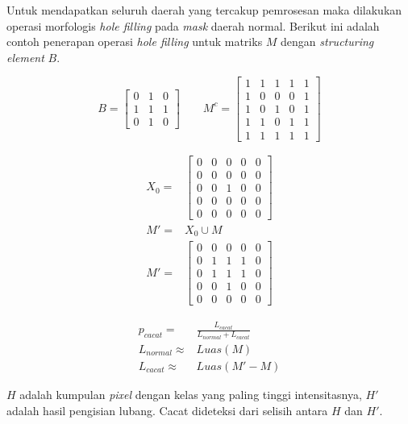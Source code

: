 \documentclass[laporan.tex]{subfiles}
\begin{document}
Untuk mendapatkan seluruh daerah yang tercakup pemrosesan maka dilakukan operasi morfologis \emph{hole filling} pada \emph{mask} daerah normal. Berikut ini adalah contoh penerapan operasi \emph{hole filling} untuk matriks $M$ dengan \emph{structuring element} $B$.

\begin{equation*}
B = \begin{bmatrix}
0 & 1 & 0 \\
1 & 1 & 1 \\
0 & 1 & 0
\end{bmatrix} \qquad
M^c = \begin{bmatrix}
1 & 1 & 1 & 1 & 1 \\
1 & 0 & 0 & 0 & 1 \\
1 & 0 & 1 & 0 & 1 \\
1 & 1 & 0 & 1 & 1 \\
1 & 1 & 1 & 1 & 1
\end{bmatrix}
\end{equation*}

\begin{align*}
X_0 = & \begin{bmatrix}
0 & 0 & 0 & 0 & 0 \\
0 & 0 & 0 & 0 & 0 \\
0 & 0 & 1 & 0 & 0 \\
0 & 0 & 0 & 0 & 0 \\
0 & 0 & 0 & 0 & 0
\end{bmatrix} \\
M' = & X_0 \cup M \\
M'  = & \begin{bmatrix}
0 & 0 & 0 & 0 & 0 \\
0 & 1 & 1 & 1 & 0 \\
0 & 1 & 1 & 1 & 0 \\
0 & 0 & 1 & 0 & 0 \\
0 & 0 & 0 & 0 & 0
\end{bmatrix}
\end{align*}

\begin{align}
	p_{cacat} = & \frac{L_{cacat}}{L_{normal} + L_{cacat}} \\
	L_{normal} \approx & Luas(M) \\
	L_{cacat} \approx & Luas(M' - M)
\end{align}

$H$ adalah kumpulan \emph{pixel} dengan kelas yang paling tinggi intensitasnya, $H'$ adalah hasil pengisian lubang. Cacat dideteksi dari selisih antara $H$ dan $H'$.
\end{document}
